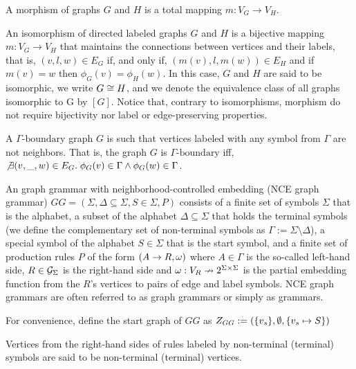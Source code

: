 \documentclass[]{report}
\begin{document}
\begin{definition}
	\label{def:morphism}
	A morphism of graphs $G$ and $H$ is a total mapping $m: V_G \to V_H$.
\end{definition}

\begin{definition}
	An isomorphism of directed labeled graphs $G$ and $H$ is a bijective mapping $m: V_G \to V_H$ that maintains the connections between vertices and their labels, that is, $(v,l,w) \in E_G$ if, and only if,  $(m(v),l,m(w)) \in E_H$ and if $m(v) = w$ then $\phi_G(v) = \phi_H(w)$. In this case, $G$ and $H$ are said to be isomorphic, we write $G \isomorph H$, and we denote the equivalence class of all graphs isomorphic to G by $[G]$.
	Notice that, contrary to isomorphisms, morphism do not require bijectivity nor label or edge-preserving properties.
\end{definition}

\begin{definition}
	A $\Gamma\text{-boundary}$ graph $G$ is such that vertices labeled with any symbol from $\Gamma$ are not neighbors. That is, the graph $G$ is $\Gamma\text{-boundary}$ iff, $\not\exists (v,\_,w) \in E_G \. \phi_G(v) \in \Gamma \land \phi_G(w) \in \Gamma$.
\end{definition}


\begin{definition}
	\label{def:gg}
	An graph grammar with neighborhood-controlled embedding (NCE graph grammar) $GG = (\Sigma, \Delta \subseteq \Sigma, S \in \Sigma, P)$ consists of a finite set of symbols $\Sigma$ that is the alphabet, a subset of the alphabet $\Delta \subseteq \Sigma$ that holds the terminal symbols (we define the complementary set of non-terminal symbols as $\Gamma := \Sigma \setminus \Delta$), a special symbol of the alphabet $S \in \Sigma$ that is the start symbol, and a finite set of production rules $P$ of the form $(A \pro R, \omega)$ where $A \in \Gamma$ is the so-called left-hand side, $R \in \allgraphs{\Sigma}$ is the right-hand side and $\omega : V_R \pto 2^{\Sigma \times \Sigma}$ is the partial embedding function from the $R$'s vertices to pairs of edge and label symbols. NCE graph grammars are often referred to as graph grammars or simply as grammars.
	
	For convenience, define the start graph of $GG$ as $\startG{GG} := (\{v_s\},\emptyset,\{v_s \mapsto S\})$
	
	Vertices from the right-hand sides of rules labeled by non-terminal (terminal) symbols are said to be non-terminal (terminal) vertices.
\end{definition}
\end{document}
